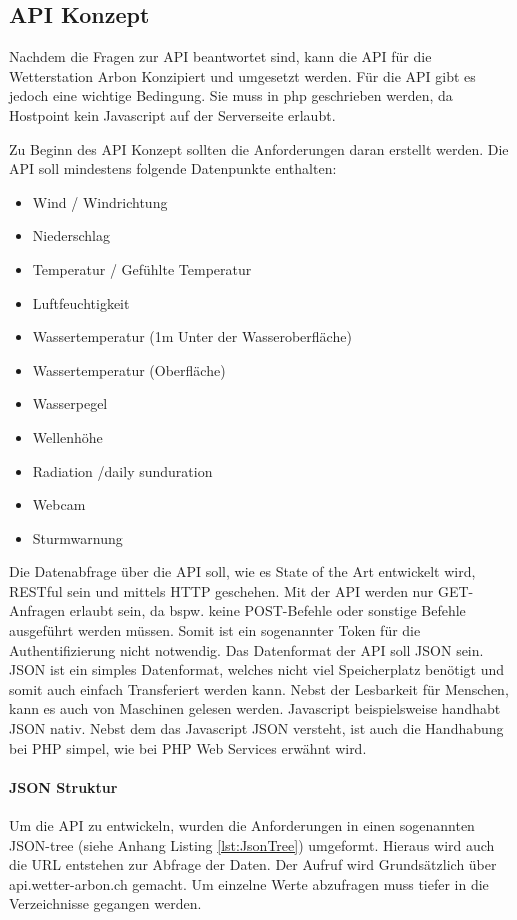 \subsection{API Konzept}
Nachdem die Fragen zur API beantwortet sind, kann die API für die Wetterstation Arbon Konzipiert und umgesetzt werden. Für die API gibt es jedoch eine wichtige Bedingung. Sie muss in php geschrieben werden, da Hostpoint kein Javascript auf der Serverseite erlaubt.

Zu Beginn des API Konzept sollten die Anforderungen daran erstellt werden. Die API soll mindestens folgende Datenpunkte enthalten:
\begin{itemize}
\item Wind / Windrichtung
\item Niederschlag
\item Temperatur / Gefühlte Temperatur
\item Luftfeuchtigkeit
\item Wassertemperatur (1m Unter der Wasseroberfläche)
\item Wassertemperatur (Oberfläche)
\item Wasserpegel
\item Wellenhöhe
\item Radiation /daily sunduration
\item Webcam
\item Sturmwarnung
\end{itemize}
Die Datenabfrage über die API soll, wie es State of the Art entwickelt wird, RESTful sein und mittels HTTP geschehen. Mit der API werden nur GET-Anfragen erlaubt sein, da bspw. keine POST-Befehle oder sonstige Befehle ausgeführt werden müssen. Somit ist ein sogenannter Token für die Authentifizierung nicht notwendig. Das Datenformat der API soll JSON sein. JSON ist ein simples Datenformat, welches nicht viel Speicherplatz benötigt und somit auch einfach Transferiert werden kann. Nebst der Lesbarkeit für Menschen, kann es auch von Maschinen gelesen werden. Javascript beispielsweise handhabt JSON nativ. Nebst dem das Javascript JSON versteht, ist auch die Handhabung bei PHP simpel, wie bei PHP Web Services \cite{LornaJaneMitchell2013oreilly} erwähnt wird. 

\paragraph{JSON Struktur}

Um die API zu entwickeln, wurden die Anforderungen in einen sogenannten JSON-tree (siehe Anhang Listing \ref{lst:JsonTree}) umgeformt. Hieraus wird auch die URL entstehen zur Abfrage der Daten. Der Aufruf wird Grundsätzlich über api.wetter-arbon.ch gemacht. Um einzelne Werte abzufragen muss tiefer in die Verzeichnisse gegangen werden.


